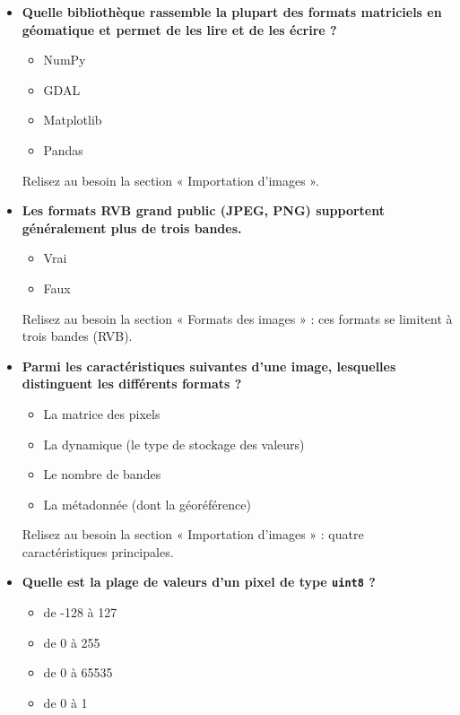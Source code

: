 \documentclass[
  french,
  11pt,
  letterpaper,
  open=any,
  twoside=false,
  french]{scrbook}
\providecommand{\tightlist}{%
  \setlength{\itemsep}{0pt}\setlength{\parskip}{0pt}}
\begin{document}
\begin{itemize}
\item
  \textbf{Quelle bibliothèque rassemble la plupart des formats
  matriciels en géomatique et permet de les lire et de les écrire ?}

  \begin{itemize}
  \tightlist
  \item
    NumPy
  \item
    GDAL
  \item
    Matplotlib
  \item
    Pandas
  \end{itemize}

  Relisez au besoin la section « Importation d'images ».
\item
  \textbf{Les formats RVB grand public (JPEG, PNG) supportent
  généralement plus de trois bandes.}

  \begin{itemize}
  \tightlist
  \item
    Vrai
  \item
    Faux
  \end{itemize}

  Relisez au besoin la section « Formats des images » : ces formats se
  limitent à trois bandes (RVB).
\item
  \textbf{Parmi les caractéristiques suivantes d'une image, lesquelles
  distinguent les différents formats ?}

  \begin{itemize}
  \tightlist
  \item
    La matrice des pixels
  \item
    La dynamique (le type de stockage des valeurs)
  \item
    Le nombre de bandes
  \item
    La métadonnée (dont la géoréférence)
  \end{itemize}

  Relisez au besoin la section « Importation d'images » : quatre
  caractéristiques principales.
\item
  \textbf{Quelle est la plage de valeurs d'un pixel de type
  \texttt{uint8} ?}

  \begin{itemize}
  \tightlist
  \item
    de -128 à 127
  \item
    de 0 à 255
  \item
    de 0 à 65535
  \item
    de 0 à 1
  \end{itemize}


\end{itemize}
\end{document}
